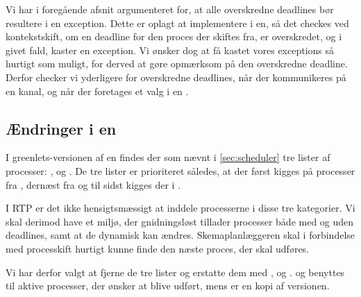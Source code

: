 Vi har i foregående afsnit argumenteret for, at alle overskredne deadlines bør resultere i en exception. Dette er oplagt at implementere i \sched en, så det checkes ved kontekstskift, om en deadline for den proces der skiftes fra, er overskredet, og i givet fald, kaster en exception. Vi ønsker dog at få kastet vores exceptions så hurtigt som muligt, for derved at gøre opmærksom på den overskredne deadline. Derfor checker vi yderligere for overskredne deadlines, når der kommunikeres på en kanal, og når der foretages et valg i en . 

\subsection{Ændringer i \sched en}
\label{sec:sched-changes}
I greenlets-versionen af \sched en findes der som nævnt i \cref{sec:scheduler} tre lister af processer: ,  og . De tre lister er prioriteret således, at der først kigges på processer fra , dernæst fra  og til sidst kigges der i .

I RTP er det ikke hensigtsmæssigt at inddele processerne i disse tre  kategorier. Vi skal derimod have et miljø, der gnidningsløst tillader processer både med og uden deadlines, samt at de dynamisk kan ændres. Skemaplanlæggeren skal i forbindelse med processkift hurtigt kunne finde den næste proces, der skal udføres.

Vi har derfor valgt at fjerne  de tre lister og erstatte dem  med ,   og .  og    benyttes til aktive processer, der ønsker at blive udført, mens  er en kopi af \des versionen. 

